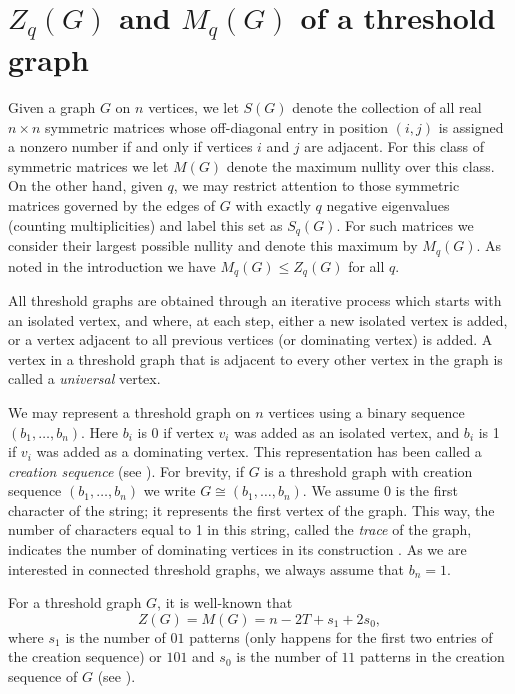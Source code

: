 \documentclass[3p,times,12pt]{article}
\begin{document}
\section{$Z_{q}(G)$ and $M_q(G)$ of a threshold graph}


Given a graph $G$ on $n$ vertices, we let $S(G)$ denote the collection of all real $n \times n$ symmetric matrices whose off-diagonal entry in position $(i,j)$ is assigned a nonzero number if and only if vertices $i$ and $j$ are adjacent. For this class of symmetric matrices we let $M(G)$ denote the maximum nullity over this class.  On the other hand, given $q$, we may restrict attention to those symmetric matrices governed by the edges of $G$ with exactly $q$ negative eigenvalues (counting multiplicities) and label this set as $S_q(G)$. For such matrices we consider their largest possible nullity and denote this maximum by $M_q (G)$. As noted in the introduction we have $M_q (G) \leq Z_q (G)$ for all $q$.


All threshold graphs are obtained through an iterative process which starts with an isolated vertex, and where, at
each step, either a new isolated vertex is added, or a vertex adjacent to all previous vertices (or dominating
vertex) is added. A vertex in a threshold graph that is adjacent to every other vertex in the graph is called a {\em universal} vertex.

We may represent a threshold graph on $n$ vertices using a binary sequence $(b_1, \ldots, b_n)$. Here $b_i$ is 0 if vertex $v_i$ was added as an isolated vertex, and $b_i$ is 1 if $v_i$ was added as a dominating vertex. This representation has been called a {\em creation sequence} (see \cite{HSS}). For brevity, if $G$ is a threshold graph with creation sequence $(b_1, \ldots, b_n)$ we write $G \cong (b_1, \ldots, b_n)$. We assume 0 is the first character of the string; it represents the first vertex of the graph. This way, the number of characters equal to 1 in this string, called the {\em trace} of the graph, indicates the number of dominating vertices in its construction \cite{Mer}. As we are interested in connected threshold graphs, we always assume that $b_n =1$. 

 For a threshold graph $G$, it is well-known that 
 \begin{equation}\label{well-known on Z}
 Z(G)=M(G)=n-2T+s_1+2s_0,
 \end{equation} where $s_1$ is the number of  $01$ patterns  (only happens for the first two entries of the creation sequence) or $101$ and $s_0$ is the number of $11$  patterns in the creation sequence of $G$ (see \cite{ShuWan}). 
 
\end{document}
